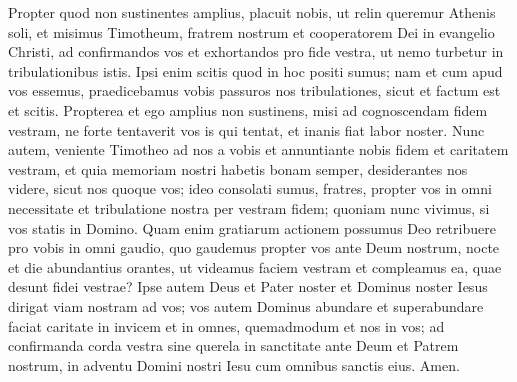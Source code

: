 \begin{biblechapter}  
\verse Propter quod non sustinentes amplius, placuit nobis, ut relin queremur Athenis soli, 
\verse et misimus Timotheum, fratrem nostrum et cooperatorem Dei in evangelio Christi, ad confirmandos vos et exhortandos pro fide vestra, 
\verse ut nemo turbetur in tribulationibus istis. Ipsi enim scitis quod in hoc positi sumus; 
\verse nam et cum apud vos essemus, praedicebamus vobis passuros nos tribulationes, sicut et factum est et scitis. 
\verse Propterea et ego amplius non sustinens, misi ad cognoscendam fidem vestram, ne forte tentaverit vos is qui tentat, et inanis fiat labor noster. 
\verse Nunc autem, veniente Timotheo ad nos a vobis et annuntiante nobis fidem et caritatem vestram, et quia memoriam nostri habetis bonam semper, desiderantes nos videre, sicut nos quoque vos; 
\verse ideo consolati sumus, fratres, propter vos in omni necessitate et tribulatione nostra per vestram fidem; 
\verse quoniam nunc vivimus, si vos statis in Domino. 
\verse Quam enim gratiarum actionem possumus Deo retribuere pro vobis in omni gaudio, quo gaudemus propter vos ante Deum nostrum, 
\verse nocte et die abundantius orantes, ut videamus faciem vestram et compleamus ea, quae desunt fidei vestrae? 
\verse Ipse autem Deus et Pater noster et Dominus noster Iesus dirigat viam nostram ad vos; 
\verse vos autem Dominus abundare et superabundare faciat caritate in invicem et in omnes, quemadmodum et nos in vos; 
\verse ad confirmanda corda vestra sine querela in sanctitate ante Deum et Patrem nostrum, in adventu Domini nostri Iesu cum omnibus sanctis eius. Amen. 
\end{biblechapter}

